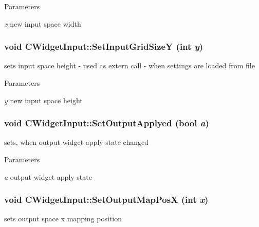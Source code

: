 \begin{DoxyParams}{Parameters}
\item[{\em x}]new input space width \end{DoxyParams}
\hypertarget{classCWidgetInput_a923841c18ee3d55ab086f65723fb9431}{
\subsubsection[{SetInputGridSizeY}]{\setlength{\rightskip}{0pt plus 5cm}void CWidgetInput::SetInputGridSizeY (int {\em y})}}
\label{classCWidgetInput_a923841c18ee3d55ab086f65723fb9431}
sets input space height -\/ used as extern call -\/ when settings are loaded from file


\begin{DoxyParams}{Parameters}
\item[{\em y}]new input space height \end{DoxyParams}
\hypertarget{classCWidgetInput_ae3634dfaddc44903f0e15355a72fa673}{
\subsubsection[{SetOutputApplyed}]{\setlength{\rightskip}{0pt plus 5cm}void CWidgetInput::SetOutputApplyed (bool {\em a})}}
\label{classCWidgetInput_ae3634dfaddc44903f0e15355a72fa673}
sets, when output widget apply state changed


\begin{DoxyParams}{Parameters}
\item[{\em a}]output widget apply state \end{DoxyParams}
\hypertarget{classCWidgetInput_a41ac9fa40929572261cb934016f77696}{
\subsubsection[{SetOutputMapPosX}]{\setlength{\rightskip}{0pt plus 5cm}void CWidgetInput::SetOutputMapPosX (int {\em x})}}
\label{classCWidgetInput_a41ac9fa40929572261cb934016f77696}
sets output space x mapping position


